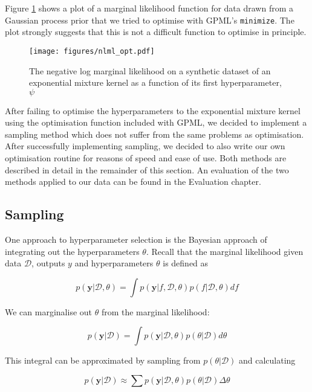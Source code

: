 \documentclass[a4paper,12pt,twoside,openright]{report}
\begin{document}
Figure \ref{nlmlopt} shows a plot of a marginal likelihood function for data drawn from a Gaussian process prior that we tried to optimise with GPML's \texttt{minimize}. The plot strongly suggests that this is not a difficult function to optimise in principle.

\begin{figure}
\centering
  \centering
  \texttt{[image: figures/nlml\_opt.pdf]}
  \caption{The negative log marginal likelihood on a synthetic dataset of an exponential mixture kernel as a function of its first hyperparameter, $\psi$}
  \label{nlmlopt}
\end{figure}

After failing to optimise the hyperparameters to the exponential mixture kernel using the optimisation function included with GPML, we decided to implement a sampling method which does not suffer from the same problems as optimisation. After successfully implementing sampling, we decided to also write our own optimisation routine for reasons of speed and ease of use. Both methods are described in detail in the remainder of this section. An evaluation of the two methods applied to our data can be found in the Evaluation chapter.

\subsection{Sampling}
One approach to hyperparameter selection is the Bayesian approach of integrating out the hyperparameters $\theta$. Recall that the marginal likelihood given data $\mathcal{D}$, outputs $y$ and hyperparameters $\theta$ is defined as

\begin{equation}
p(\mathbf{y}|\mathcal{D}, \theta) = \int p(\mathbf{y}|f, \mathcal{D}, \theta)p(f|\mathcal{D}, \theta) df
\end{equation}

We can marginalise out $\theta$ from the marginal likelihood:

\begin{equation}
p(\mathbf{y}|\mathcal{D}) = \int p(\mathbf{y}|\mathcal{D}, \theta)p(\theta|\mathcal{D}) d\theta
\end{equation}

This integral can be approximated by sampling from $p(\theta|\mathcal{D})$ and calculating

\begin{equation}
p(\mathbf{y}|\mathcal{D}) \approx \sum p(\mathbf{y}|\mathcal{D}, \theta)p(\theta|\mathcal{D}) \Delta\theta
\end{equation}
\end{document}
